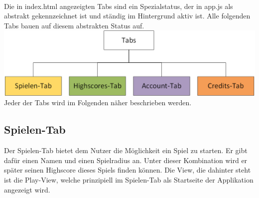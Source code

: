 \\
Die in index.html angezeigten Tabs sind ein Spezialstatus, der in app.js als abstrakt gekennzeichnet ist und ständig im Hintergrund aktiv ist. Alle folgenden Tabs bauen auf diesem abstrakten Status auf.
\\
\includegraphics[width=1\textwidth]{ref/images/tabs.png} \\ 

Jeder der Tabs wird im Folgenden näher beschrieben werden.

\subsection{Spielen-Tab}
Der Spielen-Tab bietet dem Nutzer die Möglichkeit ein Spiel zu starten. Er gibt dafür einen Namen und einen Spielradius an. Unter dieser Kombination wird er später seinen Highscore dieses Spiels finden können. Die View, die dahinter steht ist die Play-View, welche prinzipiell im Spielen-Tab als Startseite der Applikation angezeigt wird. 
